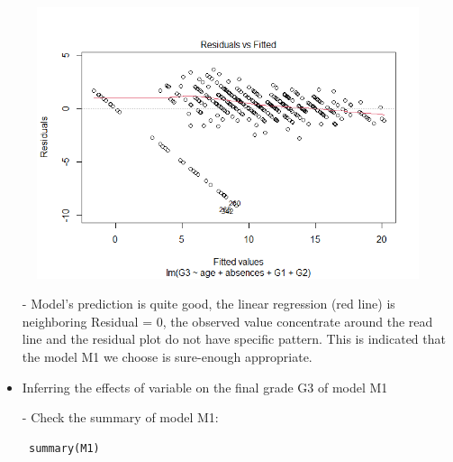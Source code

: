 \documentclass[a4paper]{article}
\numberwithin{equation}{section}
\begin{document}
\begin{figure}[H]
  \includegraphics[scale = 0.7]{residual_plot.png}
\end{figure}


\begin{itemize}
  \item[-] Model's prediction is quite good, the linear regression (red line) is neighboring Residual = 0, the observed value concentrate around the read line and the residual plot do not have specific pattern. This is indicated that the model M1 we choose is sure-enough appropriate.
\end{itemize}


\begin{itemize}
  \item Inferring the effects of variable on the final grade G3 of model M1
  \item[-] Check the summary of model M1:

        \begin{mdframed}[leftline=false,rightline=false,backgroundcolor=magenta!10,nobreak=true]
          \begin{verbatim}
 summary(M1)
  \end{verbatim}
        \end{mdframed}
\end{itemize}
\end{document}
